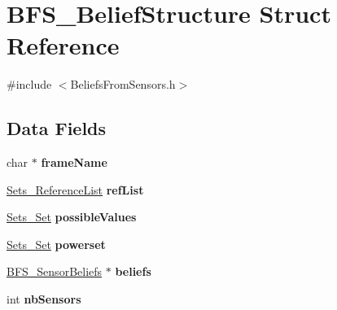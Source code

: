 \hypertarget{struct_b_f_s___belief_structure}{
\section{BFS\_\-BeliefStructure Struct Reference}
\label{struct_b_f_s___belief_structure}
}


{\ttfamily \#include $<$BeliefsFromSensors.h$>$}

\subsection*{Data Fields}
\begin{DoxyCompactItemize}
\item 
\hypertarget{struct_b_f_s___belief_structure_ab587a94be97e747de0805ad46f879ee1}{
char $\ast$ {\bfseries frameName}}
\label{struct_b_f_s___belief_structure_ab587a94be97e747de0805ad46f879ee1}

\item 
\hypertarget{struct_b_f_s___belief_structure_a049bf9892d2d4204a553cdc04c82047e}{
\hyperlink{struct_sets___reference_list}{Sets\_\-ReferenceList} {\bfseries refList}}
\label{struct_b_f_s___belief_structure_a049bf9892d2d4204a553cdc04c82047e}

\item 
\hypertarget{struct_b_f_s___belief_structure_afb7e056d2f11e2322e2bd59b85bfdfaa}{
\hyperlink{struct_sets___set}{Sets\_\-Set} {\bfseries possibleValues}}
\label{struct_b_f_s___belief_structure_afb7e056d2f11e2322e2bd59b85bfdfaa}

\item 
\hypertarget{struct_b_f_s___belief_structure_aae6a9e4e860d569b6f451669fc5ea9dd}{
\hyperlink{struct_sets___set}{Sets\_\-Set} {\bfseries powerset}}
\label{struct_b_f_s___belief_structure_aae6a9e4e860d569b6f451669fc5ea9dd}

\item 
\hypertarget{struct_b_f_s___belief_structure_a83cd6ab3c5a3781b6b18f4062fdf0604}{
\hyperlink{struct_b_f_s___sensor_beliefs}{BFS\_\-SensorBeliefs} $\ast$ {\bfseries beliefs}}
\label{struct_b_f_s___belief_structure_a83cd6ab3c5a3781b6b18f4062fdf0604}

\item 
\hypertarget{struct_b_f_s___belief_structure_a24ec5da519b25f42047e73ec9093a6a8}{
int {\bfseries nbSensors}}
\label{struct_b_f_s___belief_structure_a24ec5da519b25f42047e73ec9093a6a8}

\end{DoxyCompactItemize}


